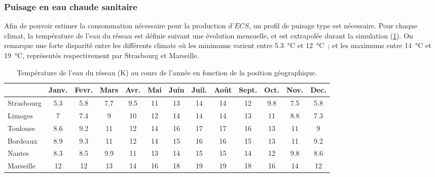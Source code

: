 \subsubsection{Puisage en eau chaude sanitaire} %
\label{ssub:puisage_en_eau_chaude_sanitaire}
Afin de pouvoir estimer la consommation nécessaire pour la production d’$ECS$, un profil
de puisage type est nécessaire. Pour chaque climat, la température de l’eau du réseau est
définie suivant une évolution mensuelle, et est extrapolée durant la simulation
(\ref{tab:temp_eau}). On remarque une forte disparité entre les différents climats où les
minimums varient entre \SI{5.3}{\celsius} et
\SI{12}{\celsius}~; et les maximums entre \SI{14}{\celsius} et \SI{19}{\celsius},
représentés respectivement par Strasbourg et Marseille.
\begin{table}
\centering
\caption{Température de l'eau du réseau (\si{\kelvin}) au cours de l'année en fonction de la
         position géographique.}
\label{tab:temp_eau}
\begin{tabular}{l*{12}{c}}
    \toprule
               & Janv. & Fevr. & Mars & Avr. & Mai & Juin & Juil. & Août & Sept. & Oct. & Nov. & Dec. \\
    \midrule
    Strasbourg & \num{5.3}   & \num{5.8}   & \num{7.7}  & \num{9.5}  & \num{11}  & \num{13}   & \num{14}    & \num{14}   & \num{12}    & \num{9.8}  & \num{7.5}  & \num{5.8}  \\
    Limoges    & \num{7}     & \num{7.4}   & \num{9}    & \num{10}   & \num{12}  & \num{14}   & \num{14}    & \num{14}   & \num{13}    & \num{11}   & \num{8.8}  & \num{7.3}  \\
    Toulouse   & \num{8.6}   & \num{9.2}   & \num{11}   & \num{12}   & \num{14}  & \num{16}   & \num{17}    & \num{17}   & \num{16}    & \num{13}   & \num{11}   & \num{9}    \\
    Bordeaux   & \num{8.9}   & \num{9.3}   & \num{11}   & \num{12}   & \num{14}  & \num{15}   & \num{16}    & \num{16}   & \num{15}    & \num{13}   & \num{11}   & \num{9.2}  \\
    Nantes     & \num{8.3}   & \num{8.5}   & \num{9.9}  & \num{11}   & \num{13}  & \num{14}   & \num{15}    & \num{15}   & \num{14}    & \num{12}   & \num{9.8}  & \num{8.6}  \\
    Marseille  & \num{12}    & \num{12}    & \num{13}   & \num{14}   & \num{16}  & \num{18}   & \num{19}    & \num{19}   & \num{18}    & \num{16}   & \num{14}   & \num{12}   \\
    \bottomrule
\end{tabular}
\end{table}


